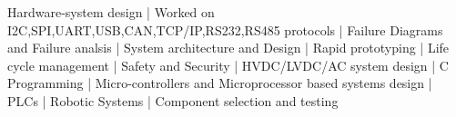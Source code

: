 

\begin{cvparagraph}

Hardware-system design | Worked on I2C,SPI,UART,USB,CAN,TCP/IP,RS232,RS485 protocols | Failure Diagrams and Failure analsis | System architecture and Design | Rapid prototyping | Life cycle management | Safety and Security | HVDC/LVDC/AC system design | C Programming | Micro-controllers and Microprocessor based systems design | PLCs | Robotic Systems | Component selection and testing

\end{cvparagraph}
